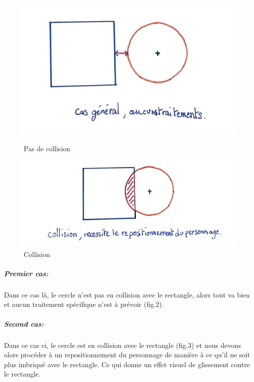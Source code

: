 \documentclass[12pt]{report}
\begin{document}
\begin{figure}
	\begin{minipage}{0.48\textwidth}
		\includegraphics[width=\linewidth]{image/fig2.jpg}
		\caption{Pas de collision}
		\label{fig:pas_de_collision}
	\end{minipage}
	\begin{minipage}{0.48\textwidth}
		\includegraphics[width=\linewidth]{image/fig3.jpg}
		\caption{Collision}
		\label{fig:collision}
	\end{minipage}
\end{figure}

\subparagraph{Premier cas:} 


Dans ce cas là, le cercle n'est pas en collision avec le rectangle, alors 
tout va bien et aucun traitement spécifique n'est à prévoir (fig.2). 

\subparagraph{Second cas:} 



Dans ce cas ci, le cercle est en collision avec le rectangle (fig.3) et nous 
devons alors procéder à un repositionnement du personnage de manière à ce 
qu'il ne soit plus imbriqué avec le rectangle. Ce qui donne un effet visuel 
de glissement contre le rectangle.
\end{document}
